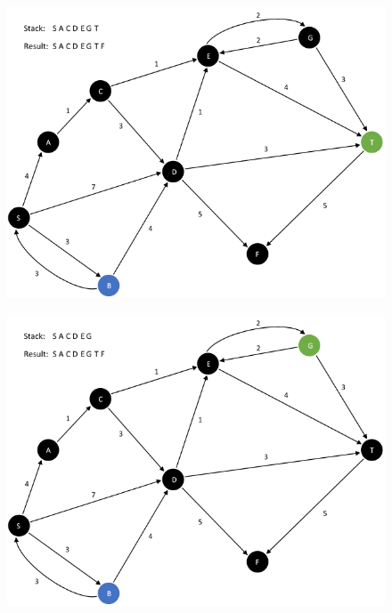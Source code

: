 \documentclass{article}
\begin{document}
\begin{enumerate}[leftmargin=\labelsep]
\begin{figure}[H]
\centering
\includegraphics[scale=0.6]{images/Q5/a/09.png}
\end{figure}

\begin{figure}[H]
\centering
\includegraphics[scale=0.6]{images/Q5/a/10.png}
\end{figure}


\end{enumerate}
\end{document}
